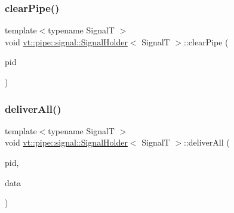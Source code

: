 \mbox{\label{structvt_1_1pipe_1_1signal_1_1_signal_holder_a9f31fab057a4e9af38547859572b6127}} 
\subsubsection{\texorpdfstring{clear\+Pipe()}{clearPipe()}}
{\footnotesize\ttfamily template$<$typename SignalT $>$ \\
void \hyperlink{structvt_1_1pipe_1_1signal_1_1_signal_holder}{vt\+::pipe\+::signal\+::\+Signal\+Holder}$<$ SignalT $>$\+::clear\+Pipe (\begin{DoxyParamCaption}\item[{\hyperlink{namespacevt_ac9852acda74d1896f48f406cd72c7bd3}{Pipe\+Type} const \&}]{pid }\end{DoxyParamCaption})}

\mbox{\label{structvt_1_1pipe_1_1signal_1_1_signal_holder_a3e04f57a784e41c422357dfda7871304}} 
\subsubsection{\texorpdfstring{deliver\+All()}{deliverAll()}}
{\footnotesize\ttfamily template$<$typename SignalT $>$ \\
void \hyperlink{structvt_1_1pipe_1_1signal_1_1_signal_holder}{vt\+::pipe\+::signal\+::\+Signal\+Holder}$<$ SignalT $>$\+::deliver\+All (\begin{DoxyParamCaption}\item[{\hyperlink{namespacevt_ac9852acda74d1896f48f406cd72c7bd3}{Pipe\+Type} const \&}]{pid,  }\item[{\hyperlink{structvt_1_1pipe_1_1signal_1_1_signal_holder_aad5bfc2b46dfa071ae638385324d7e31}{Data\+Ptr\+Type}}]{data }\end{DoxyParamCaption})}

\mbox{\label{structvt_1_1pipe_1_1signal_1_1_signal_holder_aeea971b494ab1e9bd716d4a127194ea3}} 
